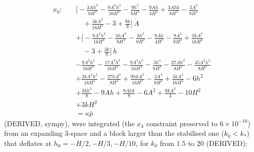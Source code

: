 \documentclass[
  10pt,
]{article}
\begin{document}
\[ \begin{aligned} x_0:\quad &\Big[- \frac{3 A h^{3}}{8 H^{4}} - \frac{9 A^{2} h^{2}}{16 H^{4}} - \frac{9 h^{2}}{8 H^{2}} - \frac{9 A h}{4 H^{2}} + \frac{3 A h k}{8 H^{2}} - \frac{3 A^{2}}{8 H^{2}} \\
   &\quad + \frac{3 k A^{2}}{16 H^{2}} - 3 + \frac{9 k}{8}\Big]\,\dot A \\
   &+ \Big[- \frac{9 A^{2} h^{2}}{16 H^{4}} - \frac{3 h A^{3}}{8 H^{4}} - \frac{3 h^{2}}{8 H^{2}} - \frac{9 A h}{4 H^{2}} - \frac{9 A^{2}}{8 H^{2}} + \frac{3 k A^{2}}{16 H^{2}} \\
   &\quad -3 + \frac{3 k}{8}\Big]\,\dot h \\
   &- \frac{9 A^{2} h^{4}}{16 H^{4}} - \frac{17 A^{3} h^{3}}{16 H^{4}} - \frac{9 A^{4} h^{2}}{16 H^{4}} - \frac{3 h^{4}}{8 H^{2}} - \frac{27 A h^{3}}{8 H^{2}} - \frac{45 A^{2} h^{2}}{8 H^{2}} \\
   &+ \frac{3 k A^{2} h^{2}}{16 H^{2}} - \frac{27 h A^{3}}{8 H^{2}} + \frac{9 h k A^{3}}{16 H^{2}} - \frac{3 A^{4}}{8 H^{2}} + \frac{3 k A^{4}}{16 H^{2}} - 6 h^{2} \\
   &+ \frac{3 k h^{2}}{8} - 9 A h + \frac{9 A h k}{8} - 6 A^{2} + \frac{9 k A^{2}}{4} - 10 H^{2} \\
   &+ 3 k H^{2} \\
   &= \kappa\bar p \end{aligned} \] (DERIVED, sympy), were integrated
(the \(x_4\) constraint preserved to \(6\times10^{-10}\)) from an
expanding 3-space and a block larger than the stabilised one
(\(k_0 < k_*\)) that deflates at \(h_0 = -H/2, -H/3, -H/10\), for
\(k_0\) from \(1.5\) to \(20\) (DERIVED):
\end{document}
